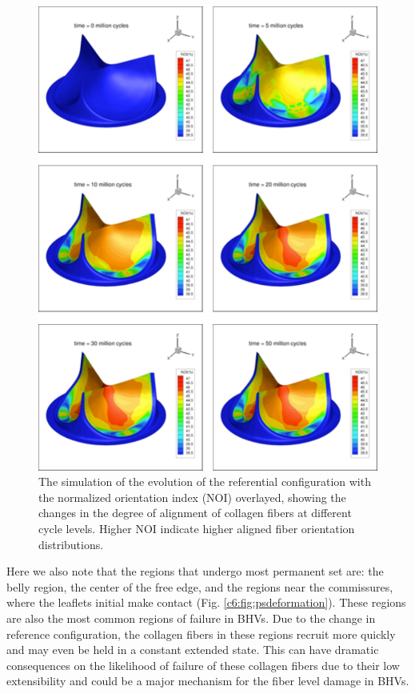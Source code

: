 \begin{figure}
\centering
\includegraphics[width=5in]{Images/chapter6/permanentsetnoi.pdf}
\caption{The simulation of the evolution of the referential configuration with the normalized orientation index (NOI) overlayed, showing the changes in the degree of alignment of collagen fibers at different cycle levels. Higher NOI indicate higher aligned fiber orientation distributions.}
\label{c6:fig:psnoi}
\end{figure}
    
    Here we also note that the regions that undergo most permanent set are: the belly region, the center of the free edge, and the regions near the commissures, where the leaflets initial make contact (Fig. \ref{c6:fig:psdeformation}). These regions are also the most common regions of failure in BHVs. Due to the change in reference configuration, the collagen fibers in these regions recruit more quickly and may even be held in a constant extended state. This can have dramatic consequences on the likelihood of failure of these collagen fibers due to their low extensibility and could be a major mechanism for the fiber level damage in BHVs. 
    
